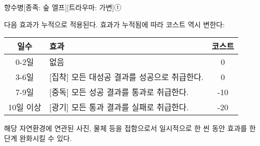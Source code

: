 \documentclass{report}
\begin{document}
	\begin{story}{향수병}{[종족: 숲 엘프][트라우마: 가변]ⓣ}
		
		{다음 효과가 누적으로 적용된다. 효과가 누적됨에 따라 코스트 역시 변한다:
		\begin{center}
			\begin{tabular}{c|l|c}
				\textbf{일수}      & \textbf{효과}                                & \textbf{코스트}\\\hline\hline
				0-2일              & 없음                                         & 0              \\\hline
				3-6일              & [집착] 모든 대성공 결과를 성공으로 취급한다. & 0              \\\hline
				7-9일              & [중독] 모든 성공 결과를 통과로 취급한다.     & -10            \\\hline
				10일 이상          & [광기] 모든 통과 결과를 실패로 취급한다.     & -20            \\
			\end{tabular}
		\end{center}
		
		해당 자연환경에 연관된 사진, 물체 등을 접함으로서 일시적으로 한 씬 동안 효과를 한 단계 완화시킬 수 있다.}
	\end{story}
\end{document}
